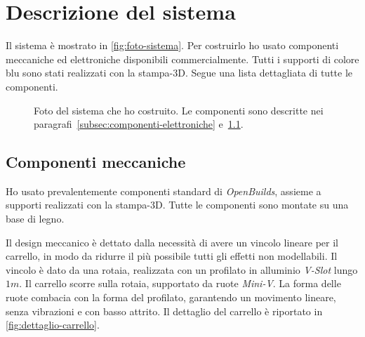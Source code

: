 \section{Descrizione del sistema}
\label{sec:sistema-reale}
Il sistema è mostrato in \autoref{fig:foto-sistema}.
Per costruirlo ho usato componenti meccaniche ed elettroniche
disponibili commercialmente. Tutti i supporti di colore blu sono stati
realizzati con la stampa-3D. Segue una lista dettagliata di tutte le componenti.


\begin{figure}[H]
    \centering
    \caption[Foto del sistema]{Foto del sistema che ho costruito.
    Le componenti sono descritte nei
    paragrafi~\ref{subsec:componenti-elettroniche} e~\ref{subsec:componenti-meccaniche}.}
    \label{fig:foto-sistema}
\end{figure}


\subsection{Componenti meccaniche}
\label{subsec:componenti-meccaniche}
Ho usato prevalentemente componenti standard di \emph{OpenBuilds},
assieme a supporti realizzati con la stampa-3D.
Tutte le componenti sono montate su una base di legno.

Il design meccanico è dettato dalla necessità di avere un vincolo
lineare per il carrello,
in modo da ridurre il più possibile tutti gli effetti non modellabili.
Il vincolo è dato da una rotaia, realizzata con un profilato in alluminio
\emph{V-Slot} lungo $1m$. Il carrello scorre sulla rotaia, supportato da
ruote \emph{Mini-V}. La forma delle ruote combacia con la forma del profilato, garantendo un movimento lineare, senza vibrazioni e con basso attrito.
Il dettaglio del carrello è riportato in \autoref{fig:dettaglio-carrello}.

